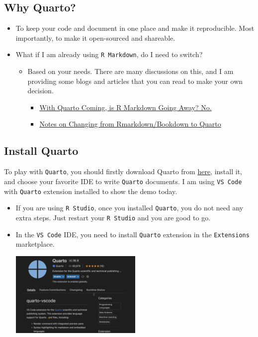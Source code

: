 \documentclass[
  letterpaper,
  DIV=11,
  numbers=noendperiod]{scrartcl}
\providecommand{\tightlist}{%
  \setlength{\itemsep}{0pt}\setlength{\parskip}{0pt}}\usepackage{longtable,booktabs,array}
\begin{document}
\hypertarget{why-quarto}{%
\subsection{Why Quarto?}\label{why-quarto}}

\begin{itemize}
\item
  To keep your code and document in one place and make it reproducible.
  Most importantly, to make it open-sourced and shareable.
\item
  What if I am already using \texttt{R\ Markdown}, do I need to switch?

  \begin{itemize}
  \tightlist
  \item
    Based on your needs. There are many discussions on this, and I am
    providing some blogs and articles that you can read to make your own
    decision.

    \begin{itemize}
    \tightlist
    \item
      \href{https://yihui.org/en/2022/04/quarto-r-markdown/}{With Quarto
      Coming, is R Markdown Going Away? No.}
    \item
      \href{https://www.njtierney.com/post/2022/04/11/rmd-to-qmd/}{Notes
      on Changing from Rmarkdown/Bookdown to Quarto}
    \end{itemize}
  \end{itemize}
\end{itemize}

\hypertarget{install-quarto}{%
\subsection{Install Quarto}\label{install-quarto}}

To play with \texttt{Quarto}, you should firstly download Quarto from
\href{https://quarto.org/docs/get-started/}{here}, install it, and
choose your favorite IDE to write \texttt{Quarto} documents. I am using
\texttt{VS\ Code} with \texttt{Quarto} extension installed to show the
demo today.

\begin{itemize}
\item
  If you are using \texttt{R\ Studio}, once you installed
  \texttt{Quarto}, you do not need any extra steps. Just restart your
  \texttt{R\ Studio} and you are good to go.
\item
  In the \texttt{VS\ Code} IDE, you need to install \texttt{Quarto}
  extension in the \texttt{Extensions} marketplace.

  \includegraphics[width=0.5\textwidth,height=\textheight]{img/quarto_extension.png}
\end{itemize}
\end{document}
